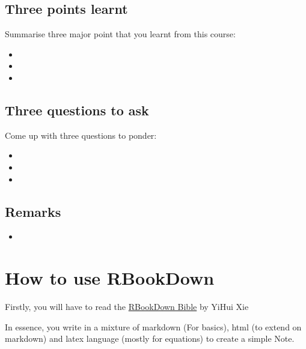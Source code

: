 \documentclass[
]{book}
\providecommand{\tightlist}{%
  \setlength{\itemsep}{0pt}\setlength{\parskip}{0pt}}
\begin{document}
\hypertarget{three-points-learnt}{%
\section*{Three points learnt}\label{three-points-learnt}}

Summarise three major point that you learnt from this course:

\begin{itemize}
\tightlist
\item
\item
\item
\end{itemize}

\hypertarget{three-questions-to-ask}{%
\section*{Three questions to ask}\label{three-questions-to-ask}}

Come up with three questions to ponder:

\begin{itemize}
\tightlist
\item
\item
\item
\end{itemize}

\hypertarget{remarks}{%
\section*{Remarks}\label{remarks}}

\begin{itemize}
\tightlist
\item
\end{itemize}

\hypertarget{how-to-use-rbookdown}{%
\chapter*{How to use RBookDown}\label{how-to-use-rbookdown}}

Firstly, you will have to read the \href{https://bookdown.org/yihui/bookdown/}{RBookDown Bible} by YiHui Xie

In essence, you write in a mixture of markdown (For basics), html (to extend on markdown) and latex language (mostly for equations) to create a simple Note.
\end{document}
